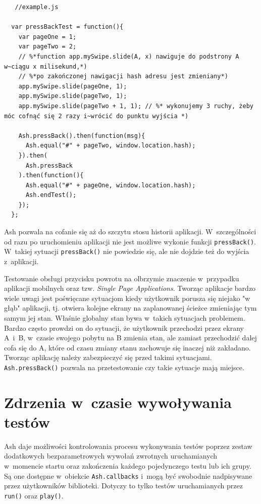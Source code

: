 \documentclass[brudnopis]{xmgr}
\begin{document}
\begin{lstlisting}
   //example.js

  var pressBackTest = function(){
    var pageOne = 1;
    var pageTwo = 2;
    // %*function app.mySwipe.slide(A, x) nawiguje do podstrony A w~ciągu x milisekund,*)
    // %*po zakończonej nawigacji hash adresu jest zmieniany*)
    app.mySwipe.slide(pageOne, 1); 
    app.mySwipe.slide(pageTwo, 1); 
    app.mySwipe.slide(pageTwo + 1, 1); // %* wykonujemy 3 ruchy, żeby móc cofnąć się 2 razy i~wrócić do punktu wyjścia *)
    
    Ash.pressBack().then(function(msg){
      Ash.equal("#" + pageTwo, window.location.hash);
    }).then(
      Ash.pressBack
    ).then(function(){
      Ash.equal("#" + pageOne, window.location.hash);
      Ash.endTest();
    });
  };
\end{lstlisting}

Ash pozwala na cofanie się aż do szczytu stosu historii aplikacji. W~szczególności od razu po uruchomieniu aplikacji nie jest możliwe wykonie funkcji \texttt{pressBack()}. W~takiej sytuacji \texttt{pressBack()} nie powiedzie się, ale nie dojdzie też do wyjścia z~aplikacji.

Testowanie obsługi przycisku powrotu na olbrzymie znaczenie w~przypadku aplikacji mobilnych oraz tzw. \textit{Single Page Applications}. Tworząc aplikacje bardzo wiele uwagi jest poświęcane sytuacjom kiedy użytkownik porusza się niejako "w głąb" aplikacji, tj. otwiera kolejne ekrany na zaplanowanej ścieżce zmieniając tym samym jej stan.  Właśnie globalny stan bywa w~takich sytuacjach problemem. Bardzo często prowdzi on do sytuacji, że użytkownik przechodzi przez ekrany A~i~B, w~czasie swojego pobytu na B zmienia stan, ale zamiast przechodzić dalej cofa się do A, które od czasu zmiany stanu zachowuje się inaczej niż zakładano. Tworząc aplikację należy zabezpieczyć się przed takimi sytuacjami. \texttt{Ash.pressBack()} pozwala na przetestowanie czy takie sytuacje mają miejsce. 

\section{Zdrzenia w~czasie wywoływania testów}

Ash daje możliwości kontrolowania procesu wykonywania testów poprzez zestaw dodatkowych bezparametrowych wywołań zwrotnych uruchamianych w~momencie startu oraz zakończenia każdego pojedynczego testu lub ich grupy. Są one dostępne w~obiekcie \texttt{Ash.callbacks} i~mogą być swobodnie nadpisywane przez użytkowników biblioteki. Dotyczy to tylko testów uruchamianych przez \texttt{run()} oraz \texttt{play()}.
\end{document}
